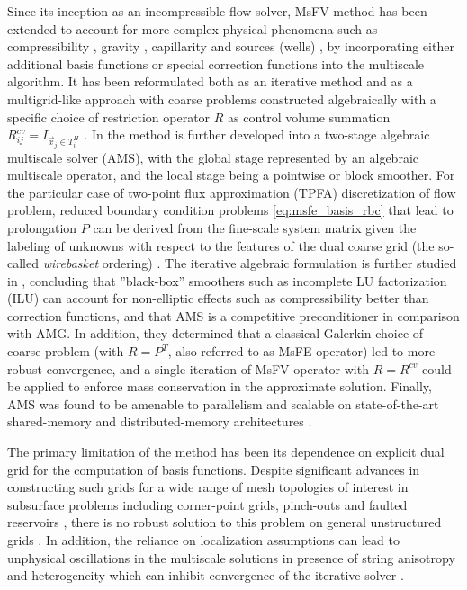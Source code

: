 Since its inception as an incompressible flow solver, MsFV method has been extended to account for more complex physical phenomena such as compressibility \cite{Lunati2006}, gravity \cite{Lunati2008,Lee2008}, capillarity \cite{Lee2008} and sources (wells) \cite{Wolfsteiner2006,Lee2008}, by incorporating either additional basis functions or special correction functions into the multiscale algorithm.   It has been reformulated both as an iterative method \cite{Hajibeygi2008} and as a multigrid-like approach with coarse problems constructed algebraically with a specific choice of restriction operator $R$ as control volume summation $R_{ij}^{cv} = I_{\vec{x}_j \in T_i^H}$ \cite{Zhou2008}.   In \cite{Zhou2010,Zhou2012} the method is further developed into a two-stage algebraic multiscale solver (AMS), with the global stage represented by an algebraic multiscale operator, and the local stage being a pointwise or block smoother.   For the particular case of two-point flux approximation (TPFA) discretization of flow problem, reduced boundary condition problems \cref{eq:msfe_basis_rbc} that lead to prolongation $P$ can be derived from the fine-scale system matrix given the labeling of unknowns with respect to the features of the dual coarse grid (the so-called \textit{wirebasket} ordering) \cite{Zhou2010}.   The iterative algebraic formulation is further studied in \cite{Wang2014,Wang2015}, concluding that ''black-box'' smoothers such as incomplete LU factorization (ILU) can account for non-elliptic effects such as compressibility better than correction functions, and that AMS is a competitive preconditioner in comparison with AMG.   In addition, they determined that a classical Galerkin choice of coarse problem (with $R = P^T$, also referred to as MsFE operator) led to more robust convergence, and a single iteration of MsFV operator with $R = R^{cv}$ could be applied to enforce mass conservation in the approximate solution.   Finally, AMS was found to be amenable to parallelism and scalable on state-of-the-art shared-memory and distributed-memory architectures \cite{Manea2015,Manea2016,Manea2019}.

The primary limitation of the method has been its dependence on explicit dual grid for the computation of basis functions.   Despite significant advances in constructing such grids for a wide range of mesh topologies of interest in subsurface problems including corner-point grids, pinch-outs and faulted reservoirs \cite{Moyner2014a}, there is no robust solution to this problem on general unstructured grids \cite{Moyner2014}.   In addition, the reliance on localization assumptions can lead to unphysical oscillations in the multiscale solutions in presence of string anisotropy and heterogeneity which can inhibit convergence of the iterative solver \cite{Moyner2016}.


